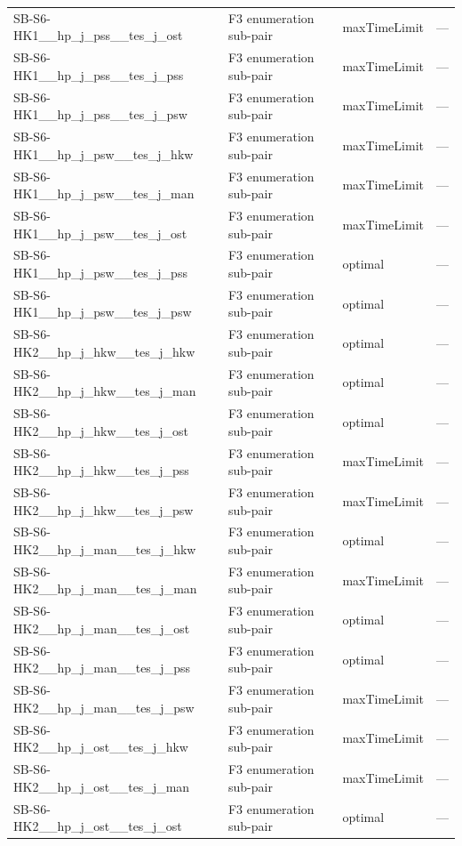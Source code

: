 \begin{table}[htbp]
\begin{tabular}{lllr}
  SB-S6-HK1\_\_hp\_j\_pss\_\_tes\_j\_ost & F3 enumeration sub-pair & maxTimeLimit & — \\
  SB-S6-HK1\_\_hp\_j\_pss\_\_tes\_j\_pss & F3 enumeration sub-pair & maxTimeLimit & — \\
  SB-S6-HK1\_\_hp\_j\_pss\_\_tes\_j\_psw & F3 enumeration sub-pair & maxTimeLimit & — \\
  SB-S6-HK1\_\_hp\_j\_psw\_\_tes\_j\_hkw & F3 enumeration sub-pair & maxTimeLimit & — \\
  SB-S6-HK1\_\_hp\_j\_psw\_\_tes\_j\_man & F3 enumeration sub-pair & maxTimeLimit & — \\
  SB-S6-HK1\_\_hp\_j\_psw\_\_tes\_j\_ost & F3 enumeration sub-pair & maxTimeLimit & — \\
  SB-S6-HK1\_\_hp\_j\_psw\_\_tes\_j\_pss & F3 enumeration sub-pair & optimal & — \\
  SB-S6-HK1\_\_hp\_j\_psw\_\_tes\_j\_psw & F3 enumeration sub-pair & optimal & — \\
  SB-S6-HK2\_\_hp\_j\_hkw\_\_tes\_j\_hkw & F3 enumeration sub-pair & optimal & — \\
  SB-S6-HK2\_\_hp\_j\_hkw\_\_tes\_j\_man & F3 enumeration sub-pair & optimal & — \\
  SB-S6-HK2\_\_hp\_j\_hkw\_\_tes\_j\_ost & F3 enumeration sub-pair & optimal & — \\
  SB-S6-HK2\_\_hp\_j\_hkw\_\_tes\_j\_pss & F3 enumeration sub-pair & maxTimeLimit & — \\
  SB-S6-HK2\_\_hp\_j\_hkw\_\_tes\_j\_psw & F3 enumeration sub-pair & maxTimeLimit & — \\
  SB-S6-HK2\_\_hp\_j\_man\_\_tes\_j\_hkw & F3 enumeration sub-pair & optimal & — \\
  SB-S6-HK2\_\_hp\_j\_man\_\_tes\_j\_man & F3 enumeration sub-pair & maxTimeLimit & — \\
  SB-S6-HK2\_\_hp\_j\_man\_\_tes\_j\_ost & F3 enumeration sub-pair & optimal & — \\
  SB-S6-HK2\_\_hp\_j\_man\_\_tes\_j\_pss & F3 enumeration sub-pair & optimal & — \\
  SB-S6-HK2\_\_hp\_j\_man\_\_tes\_j\_psw & F3 enumeration sub-pair & maxTimeLimit & — \\
  SB-S6-HK2\_\_hp\_j\_ost\_\_tes\_j\_hkw & F3 enumeration sub-pair & maxTimeLimit & — \\
  SB-S6-HK2\_\_hp\_j\_ost\_\_tes\_j\_man & F3 enumeration sub-pair & maxTimeLimit & — \\
  SB-S6-HK2\_\_hp\_j\_ost\_\_tes\_j\_ost & F3 enumeration sub-pair & optimal & — \\

\end{tabular}
\end{table}
